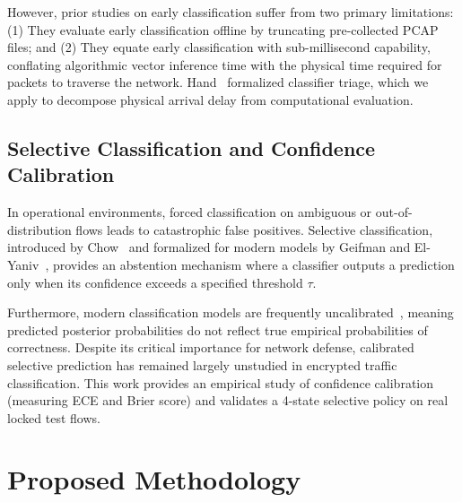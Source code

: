 \documentclass[conference]{IEEEtran}
\begin{document}
However, prior studies on early classification suffer from two primary limitations: (1) They evaluate early classification offline by truncating pre-collected PCAP files; and (2) They equate early classification with sub-millisecond capability, conflating algorithmic vector inference time with the physical time required for packets to traverse the network. Hand~\cite{hand2009measuring} formalized classifier triage, which we apply to decompose physical arrival delay from computational evaluation.

\subsection{Selective Classification and Confidence Calibration}
In operational environments, forced classification on ambiguous or out-of-distribution flows leads to catastrophic false positives. Selective classification, introduced by Chow~\cite{chow1970optimum} and formalized for modern models by Geifman and El-Yaniv~\cite{geifman2017selective,geifman2019selectivenet}, provides an abstention mechanism where a classifier outputs a prediction only when its confidence exceeds a specified threshold $\tau$.

Furthermore, modern classification models are frequently uncalibrated~\cite{guo2017calibration,niculescu2005predicting}, meaning predicted posterior probabilities do not reflect true empirical probabilities of correctness. Despite its critical importance for network defense, calibrated selective prediction has remained largely unstudied in encrypted traffic classification. This work provides an empirical study of confidence calibration (measuring ECE and Brier score) and validates a 4-state selective policy on real locked test flows.

\section{Proposed Methodology}
\label{sec:method}
\end{document}
